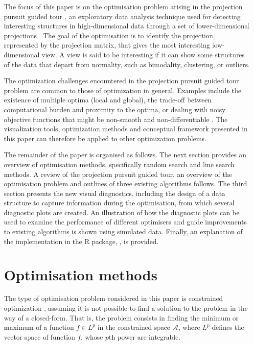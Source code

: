 The focus of this paper is on the optimisation problem arising in the
projection pursuit guided tour \citep{buja2005computational}, an
exploratory data analysis technique used for detecting interesting
structures in high-dimensional data through a set of lower-dimensional
projections \citep{cook2008grand}. The goal of the optimisation is to
identify the projection, represented by the projection matrix, that
gives the most interesting low-dimensional view. A view is said to be
interesting if it can show some structures of the data that depart from
normality, such as bimodality, clustering, or outliers.

The optimization challenges encountered in the projection pursuit guided
tour problem are common to those of optimization in general. Examples
include the existence of multiple optima (local and global), the
trade-off between computational burden and proximity to the optima, or
dealing with noisy objective functions that might be non-smooth and
non-differentiable \citep{jones1998efficient}. The visualization tools,
optimization methods and conceptual framework presented in this paper
can therefore be applied to other optimization problems.

The remainder of the paper is organised as follows. The next section
provides an overview of optimisation methods, specifically random search
and line search methods. A review of the projection pursuit guided tour,
an overview of the optimisation problem and outlines of three existing
algorithms follows. The third section presents the new visual
diagnostics, including the design of a data structure to capture
information during the optimisation, from which several diagnostic plots
are created. An illustration of how the diagnostic plots can be used to
examine the performance of different optimisers and guide improvements
to existing algorithms is shown using simulated data. Finally, an
explanation of the implementation in the R package, 
\citep{ferrn}, is provided.

\hypertarget{optim}{%
\section{Optimisation methods}\label{optim}}

The type of optimisation problem considered in this paper is constrained
optimization \citep{bertsekas2014constrained}, assuming it is not
possible to find a solution to the problem in the way of a closed-form.
That is, the problem consists in finding the minimum or maximum of a
function \(f \in L^p\) in the constrained space \(\mathcal{A}\), where
\(L^p\) defines the vector space of function \(f\), whose \(p\)th power
are integrable.

